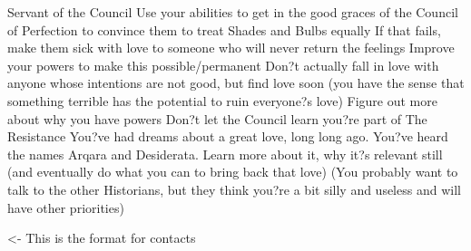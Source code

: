 \documentclass[char]{Silversiders}
\begin{document}
\name{\cLove{}}

Servant of the Council
Use your abilities to get in the good graces of the Council of Perfection to convince them to treat Shades and Bulbs equally
If that fails, make them sick with love to someone who will never return the feelings
Improve your powers to make this possible/permanent
Don?t actually fall in love with anyone whose intentions are not good, but find love soon (you have the sense that something terrible has the potential to ruin everyone?s love)
Figure out more about why you have powers
Don?t let the Council learn you?re part of The Resistance
You?ve had dreams about a great love, long long ago. You?ve heard the names Arqara and Desiderata. Learn more about it, why it?s relevant still (and eventually do what you can to bring back that love)
(You probably want to talk to the other Historians, but they think you?re a bit silly and useless and will have other priorities)

\begin{itemz}[Goals]
	\item 
\end{itemz}

\begin{itemz}[Notes]
	\item 
\end{itemz}

\begin{contacts}
	\contact{\cTest{}} <- This is the format for contacts 
\end{contacts}
\end{document}

